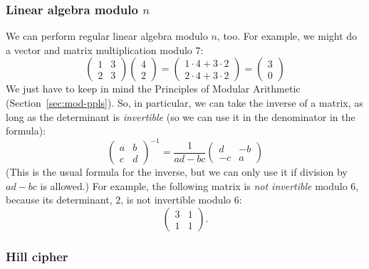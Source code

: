\documentclass{article}
\theoremstyle{plain}
\theoremstyle{definition}
\theoremstyle{remark}
\numberwithin{theorem}{section}
\begin{document}
\subsubsection{Linear algebra modulo $n$}
We can perform regular linear algebra modulo $n$, too.  For example, we might do a vector and matrix multiplication modulo $7$:
\[
	\begin{pmatrix} 1 & 3 \\ 2 & 3 \end{pmatrix}
	\begin{pmatrix} 4 \\ 2 \end{pmatrix}
	=
	\begin{pmatrix} 1 \cdot 4  + 3 \cdot 2 \\ 2 \cdot 4 + 3 \cdot 2 \end{pmatrix}
	=
	\begin{pmatrix} 3 \\ 0 \end{pmatrix}
\]
We just have to keep in mind the Principles of Modular Arithmetic (Section~\ref{sec:mod-ppls}).  So, in particular, we can take the inverse of a matrix, as long as the determinant is \emph{invertible} (so we can use it in the denominator in the formula):
\[
	\begin{pmatrix} a & b \\ c & d \end{pmatrix}^{-1}
	=
	\frac{1}{ad-bc} \begin{pmatrix} d & -b \\ -c & a \end{pmatrix}
\]
(This is the usual formula for the inverse, but we can only use it if division by $ad-bc$ is allowed.)
For example, the following matrix is \emph{not invertible} modulo $6$, because its determinant, $2$, is not invertible modulo $6$:
\[
	\begin{pmatrix} 3 & 1 \\ 1 & 1 \end{pmatrix}.
\]

\subsubsection{Hill cipher}
\end{document}
